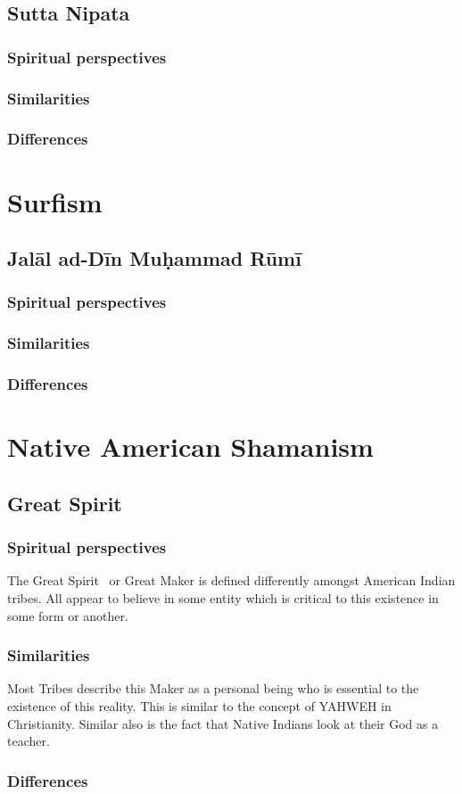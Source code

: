 \documentclass[11pt,a4paper]{scrartcl} %
\begin{document}
    \subsection{Sutta Nipata}
\subsubsection{Spiritual perspectives}
     \subsubsection{Similarities}
     \subsubsection{Differences}
    \section{Surfism}
    \subsection{Jal\={a}l ad-D\={i}n Muḥammad R\={u}m\={i} }
\subsubsection{Spiritual perspectives}
     \subsubsection{Similarities}
     \subsubsection{Differences}
     \section{Native American Shamanism}
     \subsection{Great Spirit}
     \subsubsection{Spiritual perspectives}
     The Great Spirit~\cite{wiki:001} or Great Maker is defined differently amongst American Indian tribes. All appear to believe in some entity which is critical to this existence in some form or another.
     \subsubsection{Similarities}
     Most Tribes describe this Maker as a personal being who is essential to the existence of this reality. This is similar to the  concept of YAHWEH in Christianity. Similar also is the fact that Native Indians look at their God as a teacher.
     \subsubsection{Differences}
   
\clearpage
    \nocite{*}
    
    
\end{document}
